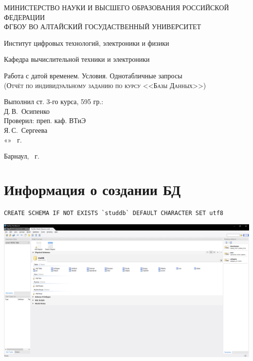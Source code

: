 \documentclass[a4paper, 12pt]{article}
\begin{document}
\begin{titlepage}
  \begin{center}
    \MakeUppercase{Министерство науки и высшего образования Российской Федерации} \\
    \MakeUppercase{ФГБОУ ВО Алтайский госудаственный университет}
    \vspace{0.25cm}
    
	  Институт цифровых технологий, электроники и физики
    
    Кафедра вычислительной техники и электроники
    \vfill
    
    {\LARGE Работа с датой временем. Условия. Однотабличные запросы}\\[5mm]
    \textsc{(Отчёт по индивидуальному заданию по курсу <<Базы Данных>>)}
  \bigskip

\end{center}
\vfill

\newlength{\ML}
\hfill
\begin{minipage}{0.45\textwidth}
  Выполнил ст. 3-го курса, 595 гр.:\\
  \underline{\hspace{\ML}} Д.\,В.~Осипенко\\
  Проверил: преп. каф. ВТиЭ\\
  \underline{\hspace{\ML}} Я.\,С.~Сергеева\\
  «\underline{\hspace{0.7cm}}» \underline{\hspace{2cm}} \the\year~г.
\end{minipage}%
\vfill

\begin{center}
  Барнаул, \the\year~г.
\end{center}
\end{titlepage}
\tableofcontents
\newpage

\section{Информация о создании БД}
\begin{lstlisting}
CREATE SCHEMA IF NOT EXISTS `studdb` DEFAULT CHARACTER SET utf8 
\end{lstlisting}
\includegraphics[width=\textwidth]{1.png}
\end{document}
